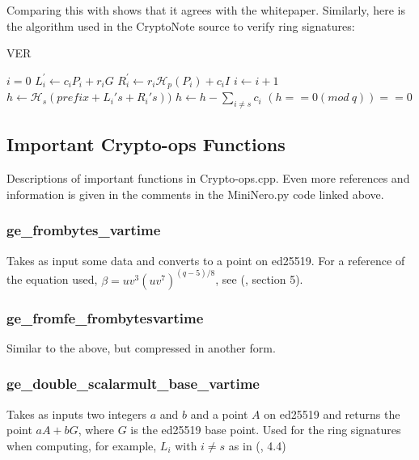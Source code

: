 \documentclass[12pt,english]{mrl}
\numberwithin{equation}{section}
\numberwithin{figure}{section}
\begin{document}
Comparing this with \cite{CN} shows that it agrees with the whitepaper.
Similarly, here is the algorithm used in the CryptoNote source
to verify ring signatures:

\begin{algorithm}[H]
\caption{VER}


\begin{algorithmic} 
\State $i=0$
	\State $L_i^{\prime}\gets c_i P_i + r_i  G$
	\State $R_i^{\prime}\gets r_i \mathcal{H}_p(P_i)+c_i I$
	\State $i \gets i+1$
\EndWhile
\State $h \gets \mathcal{H}_s(prefix+L_i's+R_i's))$
\State $h \gets h-\sum_{i\neq s} c_i$
 \State \Return $(h == 0 (mod\ q)) == 0$
\end{algorithmic} 
\end{algorithm}



\subsection{Important Crypto-ops Functions}

Descriptions of important functions in Crypto-ops.cpp. Even more references
and information is given in the comments in the MiniNero.py code linked
above. 


\subsubsection{ge\_frombytes\_vartime}

Takes as input some data and converts to a point on ed25519. For a
reference of the equation used, $\beta=uv^{3}\left(uv^{7}\right)^{\left(q-5\right)/8}$,
see (\cite{BBJLP}, section 5).


\subsubsection{ge\_fromfe\_frombytesvartime}

Similar to the above, but compressed in another form. 


\subsubsection{ge\_double\_scalarmult\_base\_vartime}

Takes as inputs two integers $a$ and $b$ and a point $A$ on ed25519
and returns the point $aA+bG$, where $G$ is the ed25519 base point.
Used for the ring signatures when computing, for example, $ $$L_{i}$
with $i\neq s$ as in (\cite{CN}, 4.4)
\end{document}
